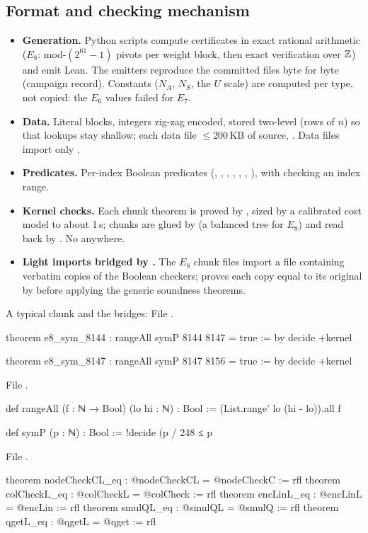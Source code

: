 \subsection{Format and checking mechanism}

\begin{itemize}
\item \textbf{Generation.} Python scripts compute certificates in
  exact rational arithmetic ($E_8$: mod-$(2^{61}-1)$ pivots per weight block, then exact verification over ${\mathbb{Z}}$) and
  emit Lean. The emitters reproduce the committed files byte for byte (campaign record). Constants
  ($N_A$, $N_S$, the $U$ scale) are computed per type, not copied: the $E_6$ values failed for $E_7$.
\item \textbf{Data.} Literal  blocks, integers zig-zag encoded, stored two-level (rows of $n$) so
  that  lookups stay shallow; each data file $\le200$\,KB of source, .
  Data files import only .
\item \textbf{Predicates.} Per-index Boolean predicates (, , , ,
  , , ), with  checking an index range.
\item \textbf{Kernel checks.} Each chunk theorem is  proved by , sized
  by a calibrated cost model to about 1\,s; chunks are glued by  (a balanced tree for $E_8$) and
  read back by . No  anywhere.
\item \textbf{Light imports bridged by .} The $E_8$ chunk files import a file 
  containing verbatim copies of the Boolean checkers;  proves each copy equal to its original
  by  before applying the generic soundness theorems.
\end{itemize}
A typical chunk and the bridges:
\noindent File .
\begin{leancode}
theorem e8_sym_8144 : rangeAll symP 8144 8147 = true := by decide +kernel

theorem e8_sym_8147 : rangeAll symP 8147 8156 = true := by decide +kernel
\end{leancode}
\noindent File .
\begin{leancode}
def rangeAll (f : ℕ → Bool) (lo hi : ℕ) : Bool := (List.range' lo (hi - lo)).all f

def symP (p : ℕ) : Bool := !decide (p / 248 ≤ p %
\end{leancode}
\noindent File .
\begin{leancode}
theorem nodeCheckCL_eq : @nodeCheckCL = @nodeCheckC := rfl
theorem colCheckL_eq : @colCheckL = @colCheck := rfl
theorem encLinL_eq : @encLinL = @encLin := rfl
theorem smulQL_eq : @smulQL = @smulQ := rfl
theorem qgetL_eq : @qgetL = @qget := rfl
\end{leancode}

